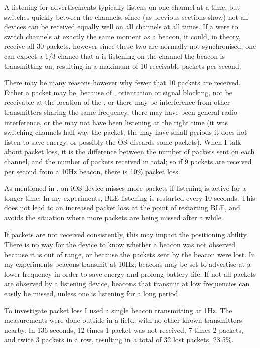 A \device listening for advertisements typically listens on one channel at a time, but switches quickly between the channels, since (as previous sections show) not all devices can be received equally well on all channels at all times.
If a \device were to switch channels at exactly the same moment as a beacon, it could, in theory, receive all 30 packets, however since these two are normally not synchronised, one can expect a 1/3 chance that a \device is listening on the channel the beacon is transmitting on, resulting in a maximum of 10 receivable packets per second.

There may be many reasons however why fewer that 10 packets are received.
Either a packet may be, because of \mpi, orientation or signal blocking, not be receivable at the location of the \device, or there may be interference from other transmitters sharing the same frequency, there may have been general radio interference, or the \device may not have been listening at the right time (it was switching channels half way the packet, the \device may have small periods it does not listen to save energy, or possibly the OS discards some packets).
When I talk about packet loss, it is the difference between the number of packets sent on each channel, and the number of packets received in total; so if 9 packets are received per second from a 10Hz beacon, there is 10\% packet loss.

As mentioned in , an iOS device misses more packets if \BLE listening is active for a longer time.
In my experiments, BLE listening is restarted every 10 seconds.
This does not lead to an increased packet loss at the point of restarting BLE, and avoids the situation where more packets are being missed after a while.

If packets are not received consistently, this may impact the positioning ability.
There is no way for the device to know whether a beacon was not observed because it is out of range, or because the packets sent by the beacon were lost.
In my experiments beacons transmit at 10Hz; beacons may be set to advertise at a lower frequency in order to save energy and prolong battery life.
If not all packets are observed by a listening device, beacons that transmit at low frequencies can easily be missed, unless one is listening for a long period.

To investigate packet loss I used a single beacon transmitting at 1Hz.
The measurements were done outside in a field, with no other known transmitters nearby.
In 136 seconds, 12 times 1 packet was not received, 7 times 2 packets, and twice 3 packets in a row, resulting in a total of 32 lost packets, 23.5\%.

